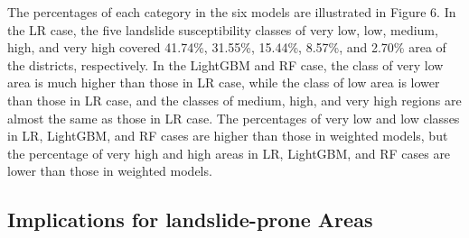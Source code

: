 \documentclass[a4paper,fleqn]{cas-sc}
\begin{document}
The percentages of each category in the six models are illustrated in Figure 6. 
In the LR case, the five landslide susceptibility classes of very low, low, medium, high, and very high covered 41.74\%, 31.55\%, 15.44\%, 8.57\%, and 2.70\% area of the districts, respectively. 
In the LightGBM and RF case, the class of very low area is much higher than those in LR case, while the class of low area is lower than those in LR case, and the classes of medium, high, and very high regions are almost the same as those in LR case. 
The percentages of very low and low classes in LR, LightGBM, and RF cases are higher than those in weighted models, but the percentage of very high and high areas in LR, LightGBM, and RF cases are lower than those in weighted models.

\subsection{Implications for landslide-prone Areas}
\end{document}
